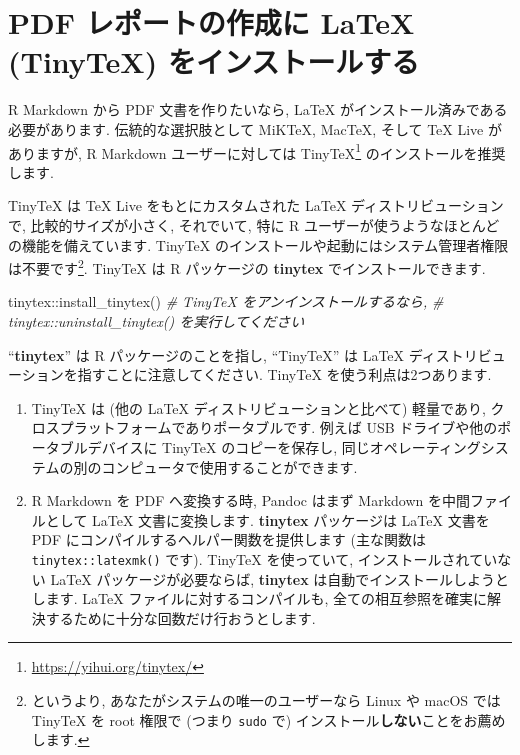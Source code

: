 \documentclass[
  11pt,
  lualatex,
  ja=standard]{bxjsreport}
\newenvironment{Shaded}{\begin{snugshade}}{\end{snugshade}}
\newcommand{\CommentTok}[1]{\textcolor[rgb]{0.56,0.35,0.01}{\textit{#1}}}
\newcommand{\FunctionTok}[1]{\textcolor[rgb]{0.00,0.00,0.00}{#1}}
\newcommand{\NormalTok}[1]{#1}
\newcommand{\SpecialCharTok}[1]{\textcolor[rgb]{0.00,0.00,0.00}{#1}}
\renewcommand{\href}[2]{#2\footnote{\url{#1}}}
\begin{document}
\hypertarget{install-latex}{%
\section{PDF レポートの作成に LaTeX (TinyTeX) をインストールする}\label{install-latex}}

R Markdown から PDF 文書を作りたいなら, LaTeX がインストール済みである必要があります. 伝統的な選択肢として MiKTeX, MacTeX, そして TeX Live がありますが, R Markdown ユーザーに対しては \href{https://yihui.org/tinytex/}{TinyTeX} のインストールを推奨します.

TinyTeX は TeX Live をもとにカスタムされた LaTeX ディストリビューションで, 比較的サイズが小さく, それでいて, 特に R ユーザーが使うようなほとんどの機能を備えています. TinyTeX のインストールや起動にはシステム管理者権限は不要です\footnote{というより, あなたがシステムの唯一のユーザーなら Linux や macOS では TinyTeX を root 権限で (つまり \texttt{sudo} で) インストール\textbf{しない}ことをお薦めします.}. TinyTeX は R パッケージの \textbf{tinytex} \autocite{R-tinytex} でインストールできます.

\begin{Shaded}
\begin{Highlighting}[numbers=left,,]
\NormalTok{tinytex}\SpecialCharTok{::}\FunctionTok{install\_tinytex}\NormalTok{()}
\CommentTok{\# TinyTeX をアンインストールするなら,}
\CommentTok{\# tinytex::uninstall\_tinytex() を実行してください}
\end{Highlighting}
\end{Shaded}

``\textbf{tinytex}'' は R パッケージのことを指し, ``TinyTeX'' は LaTeX ディストリビューションを指すことに注意してください. TinyTeX を使う利点は2つあります.

\begin{enumerate}
\def\labelenumi{\arabic{enumi}.}
\item
  TinyTeX は (他の LaTeX ディストリビューションと比べて) 軽量であり, クロスプラットフォームでありポータブルです. 例えば USB ドライブや他のポータブルデバイスに TinyTeX のコピーを保存し, 同じオペレーティングシステムの別のコンピュータで使用することができます.
\item
  R Markdown を PDF へ変換する時, Pandoc はまず Markdown を中間ファイルとして LaTeX 文書に変換します. \textbf{tinytex} パッケージは LaTeX 文書を PDF にコンパイルするヘルパー関数を提供します (主な関数は \texttt{tinytex::latexmk()} です). TinyTeX を使っていて, インストールされていない LaTeX パッケージが必要ならば, \textbf{tinytex} は自動でインストールしようとします. LaTeX ファイルに対するコンパイルも, 全ての相互参照を確実に解決するために十分な回数だけ行おうとします.
\end{enumerate}
\end{document}
